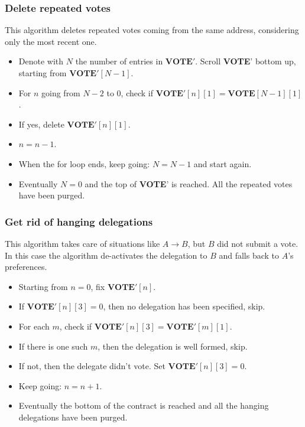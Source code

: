 \documentclass[submission, copyright,creativecommons,sharealike,noncommercial]{eptcs}
\newcommand{\Vote}{\textbf{VOTE}\xspace}
\begin{document}
\subsubsection{Delete repeated votes}\label{subsubsec:Delete repeated votes}
	This algorithm deletes repeated votes coming from the same address, considering only the most recent one.
	\begin{itemize}
		\item Denote with $N$ the number of entries in $\Vote'$. Scroll \Vote' bottom up, starting from $\Vote'[N-1]$.
		\item  For $n$ going from $N-2$ to $0$, check if $\Vote'[n][1] = \Vote[N-1][1]$.
		\item If yes, delete $\Vote'[n][1]$.
		\item $n = n-1$.		
		\item When the for loop ends, keep going: $N = N-1$ and start again.
		\item Eventually $N=0$ and the top of \Vote' is reached. All the repeated votes have been purged.
	\end{itemize}

\subsubsection{Get rid of hanging delegations}\label{subsubsec:Get rid of hanging delegations}
	This algorithm takes care of situations like $A \to B$, but $B$ did not submit a vote. In this case the algorithm de-activates the delegation to $B$ and falls back to $A$'s preferences.
	\begin{itemize}
		\item Starting from $n=0$, fix $\Vote'[n]$.
		\item If $\Vote'[n][3]=0$, then no delegation has been specified, skip.
		\item For each $m$, check if $\Vote'[n][3] = \Vote'[m][1]$.
		\item If there is one such $m$, then the delegation is well formed, skip.
		\item If not, then the delegate didn't vote. Set $\Vote'[n][3] = 0$.
		\item Keep going: $n=n+1$.
		\item Eventually the bottom of the contract is reached and all the hanging delegations have been purged.
	\end{itemize}
	
	
\end{document}
